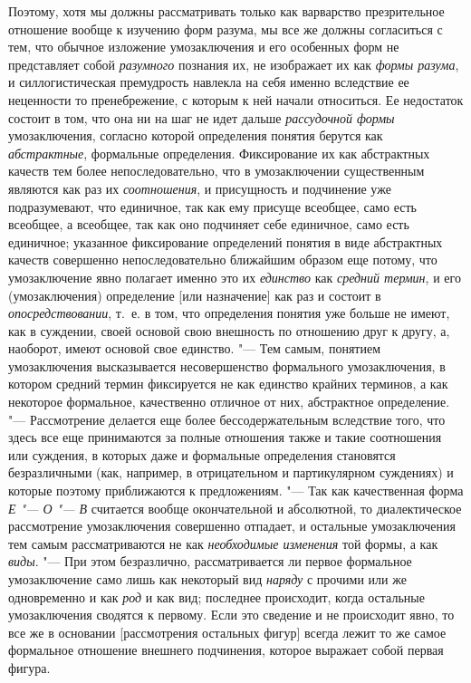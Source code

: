 Поэтому, хотя мы должны рассматривать только как варварство
презрительное отношение вообще к изучению форм разума, мы все же должны
согласиться с тем, что обычное изложение умозаключения и его особенных форм
не представляет собой {\em разумного}
познания их, не изображает их как
{\em формы разума}, и
силлогистическая премудрость навлекла на себя именно вследствие ее
неценности то пренебрежение, с которым к ней начали относиться. Ее
недостаток состоит в том, что она ни на шаг не идет дальше
{\em рассудочной формы}
умозаключения, согласно которой определения понятия берутся
как {\em абстрактные},
формальные определения. Фиксирование их как абстрактных
качеств тем более непоследовательно, что в умозаключении существенным
являются как раз их {\em соотношения},
и присущность и подчинение уже подразумевают, что единичное,
так как ему присуще всеобщее, само есть всеобщее, а всеобщее, так как оно
подчиняет себе единичное, само есть единичное; указанное фиксирование
определений понятия в виде абстрактных качеств совершенно непоследовательно
ближайшим образом еще потому, что умозаключение явно полагает именно это их
{\em единство} как
{\em средний термин}, и
его (умозаключения) определение [или назначение] как раз и состоит в
{\em опосредствовании},
т.~е. в том, что определения понятия уже больше не имеют, как
в суждении, своей основой свою внешность по отношению друг к другу, а,
наоборот, имеют основой свое единство. "--- Тем самым, понятием
умозаключения высказывается несовершенство формального умозаключения, в
котором средний термин фиксируется не как единство крайних терминов, а как
некоторое формальное, качественно отличное от них, абстрактное
определение. "--- Рассмотрение делается еще более
бессодержательным вследствие того, что здесь все еще принимаются за полные
отношения также и такие соотношения или суждения, в которых даже и
формальные определения становятся безразличными (как, например, в
отрицательном и партикулярном суждениях) и которые поэтому приближаются к
предложениям. "--- Так как качественная форма
{\em Е "--- О "--- В} считается вообще окончательной и
абсолютной, то диалектическое рассмотрение умозаключения совершенно
отпадает, и остальные умозаключения тем самым рассматриваются не как
{\em необходимые изменения}
той формы, а как
{\em виды}. "--- При этом
безразлично, рассматривается ли первое формальное умозаключение само лишь
как некоторый вид {\em наряду}
с прочими или же одновременно и как
{\em род} и как вид;
последнее происходит, когда остальные умозаключения сводятся к первому.
Если это сведение и не происходит явно, то все же в основании [рассмотрения
остальных фигур] всегда лежит то же самое формальное отношение внешнего
подчинения, которое выражает собой первая фигура.


